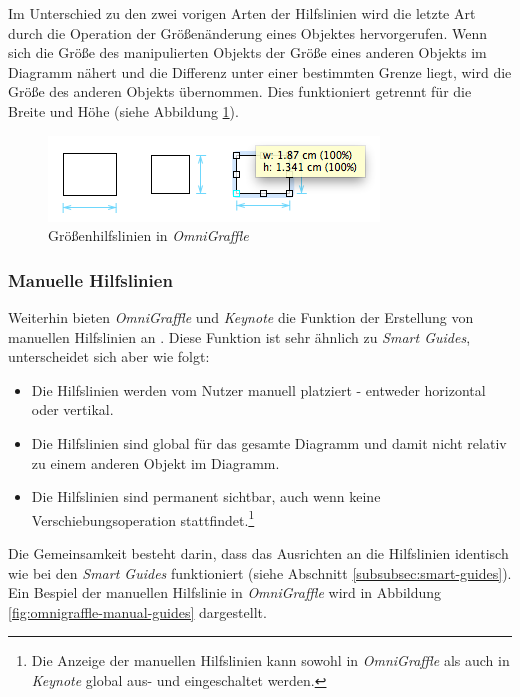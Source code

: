 Im Unterschied zu den zwei vorigen Arten der Hilfslinien wird die letzte Art durch die Operation der Größenänderung eines Objektes hervorgerufen. Wenn sich die Größe des manipulierten Objekts der Größe eines anderen Objekts im Diagramm nähert und die Differenz unter einer bestimmten Grenze liegt, wird die Größe des anderen Objekts übernommen. Dies funktioniert getrennt für die Breite und Höhe (siehe Abbildung \ref{fig:omnigraffle-sizing-guides}).

\begin{figure}[hbt]
    \centering
    \includegraphics{resources/omnigraffle-sizing-guides.png}
    \caption{Größenhilfslinien in \textit{OmniGraffle}}
    \label{fig:omnigraffle-sizing-guides}
\end{figure}

\subsubsection{Manuelle Hilfslinien}

Weiterhin bieten \textit{OmniGraffle} und \textit{Keynote} die Funktion der Erstellung von manuellen Hilfslinien an \cite{08OmniGraffle, 11Keynote}. Diese Funktion ist sehr ähnlich zu \textit{Smart Guides}, unterscheidet sich aber wie folgt:

\begin{itemize}
    \item Die Hilfslinien werden vom Nutzer manuell platziert - entweder horizontal oder vertikal.
    \item Die Hilfslinien sind global für das gesamte Diagramm und damit nicht relativ zu einem anderen Objekt im Diagramm.
    \item Die Hilfslinien sind permanent sichtbar, auch wenn keine Verschiebungsoperation stattfindet.\footnote{Die Anzeige der manuellen Hilfslinien kann sowohl in \textit{OmniGraffle} als auch in \textit{Keynote} global aus- und eingeschaltet werden.}
\end{itemize}

Die Gemeinsamkeit besteht darin, dass das Ausrichten an die Hilfslinien identisch wie bei den \textit{Smart Guides} funktioniert (siehe Abschnitt \ref{subsubsec:smart-guides}). Ein Bespiel der manuellen Hilfslinie in \textit{OmniGraffle} wird in Abbildung \ref{fig:omnigraffle-manual-guides} dargestellt.


